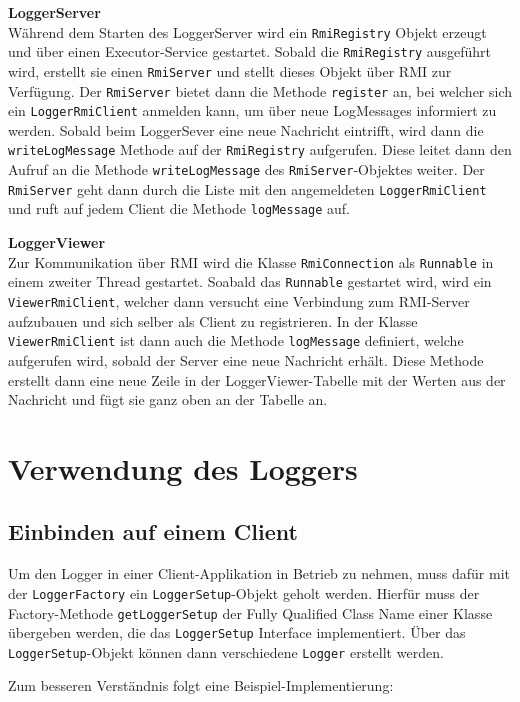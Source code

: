 \documentclass[12pt,a4paper,twosided]{scrartcl}
\begin{document}
\textbf{LoggerServer} \\
Während dem Starten des LoggerServer wird ein \texttt{RmiRegistry} Objekt erzeugt und über einen Executor-Service gestartet. Sobald die \texttt{RmiRegistry} ausgeführt wird, erstellt sie einen \texttt{RmiServer} und stellt dieses Objekt über RMI zur Verfügung. Der \texttt{RmiServer} bietet dann die Methode \texttt{register} an, bei welcher sich ein \texttt{LoggerRmiClient} anmelden kann, um über neue LogMessages informiert zu werden. Sobald beim LoggerSever eine neue Nachricht eintrifft, wird dann die \texttt{writeLogMessage} Methode auf der \texttt{RmiRegistry} aufgerufen. Diese leitet dann den Aufruf an die Methode \texttt{writeLogMessage} des \texttt{RmiServer}-Objektes weiter. Der \texttt{RmiServer} geht dann durch die Liste mit den angemeldeten \texttt{LoggerRmiClient} und ruft auf jedem Client die Methode \texttt{logMessage} auf.

\textbf{LoggerViewer} \\
Zur Kommunikation über RMI wird die Klasse \texttt{RmiConnection} als \texttt{Runnable} in einem zweiter Thread gestartet. Soabald das \texttt{Runnable} gestartet wird, wird ein \texttt{ViewerRmiClient}, welcher dann versucht eine Verbindung zum RMI-Server aufzubauen und sich selber als Client zu registrieren. In der Klasse \texttt{ViewerRmiClient} ist dann auch die Methode \texttt{logMessage} definiert, welche aufgerufen wird, sobald der Server eine neue Nachricht erhält. Diese Methode erstellt dann eine neue Zeile in der LoggerViewer-Tabelle mit der Werten aus der Nachricht und fügt sie ganz oben an der Tabelle an.

\section{Verwendung des Loggers}
\subsection{Einbinden auf einem Client}
Um den Logger in einer Client-Applikation in Betrieb zu nehmen, muss dafür mit der \texttt{LoggerFactory} ein \texttt{LoggerSetup}-Objekt geholt werden. Hierfür muss der Factory-Methode \texttt{getLoggerSetup} der Fully Qualified Class Name einer Klasse übergeben werden, die das \texttt{LoggerSetup} Interface implementiert. Über das \texttt{LoggerSetup}-Objekt können dann verschiedene \texttt{Logger} erstellt werden.

Zum besseren Verständnis folgt eine Beispiel-Implementierung:
\end{document}
